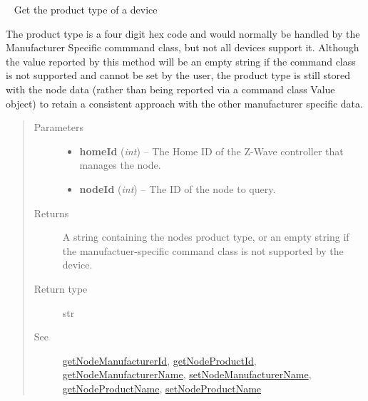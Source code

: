 \documentclass[letterpaper,10pt,english]{sphinxmanual}
\begin{document}
\begin{fulllineitems}
\begin{fulllineitems}
\begin{quote}
\begin{description}
\end{description}\end{quote}

\end{fulllineitems}


\begin{fulllineitems}
\label{libopenzwave:libopenzwave.PyManager.getNodeProductType}~\label{libopenzwave:getnodeproducttype}
Get the product type of a device

The product type is a four digit hex code and would normally be handled by the
Manufacturer Specific commmand class, but not all devices support it.  Although
the value reported by this method will be an empty string if the command class
is not supported and cannot be set by the user, the product type is still
stored with the node data (rather than being reported via a command class Value
object) to retain a consistent approach with the other manufacturer specific
data.
\begin{quote}\begin{description}
\item[{Parameters}] \leavevmode\begin{itemize}
\item {} 
\textbf{homeId} (\emph{int}) -- The Home ID of the Z-Wave controller that manages the node.

\item {} 
\textbf{nodeId} (\emph{int}) -- The ID of the node to query.

\end{itemize}

\item[{Returns}] \leavevmode
A string containing the nodes product type, or an empty string if the manufactuer-specific command class is not supported by the device.

\item[{Return type}] \leavevmode
str

\item[{See}] \leavevmode
{\hyperref[libopenzwave:getnodemanufacturerid]{getNodeManufacturerId}}, {\hyperref[libopenzwave:getnodeproductid]{getNodeProductId}}, {\hyperref[libopenzwave:getnodemanufacturername]{getNodeManufacturerName}}, {\hyperref[libopenzwave:setnodemanufacturername]{setNodeManufacturerName}},     {\hyperref[libopenzwave:getnodeproductname]{getNodeProductName}}, {\hyperref[libopenzwave:setnodeproductname]{setNodeProductName}}


\end{description}
\end{quote}
\end{fulllineitems}
\end{fulllineitems}
\end{document}

